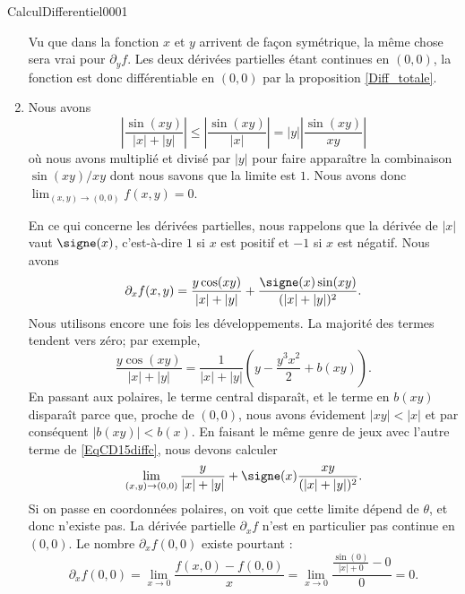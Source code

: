\begin{corrige}{CalculDifferentiel0001}
\begin{enumerate}
			Vu que dans la fonction $x$ et $y$ arrivent de façon symétrique, la même chose sera vrai pour $\partial_yf$. Les deux dérivées partielles étant continues en $(0,0)$, la fonction est donc différentiable en $(0,0)$ par la proposition \ref{Diff_totale}.


		\item
			Nous avons
			\begin{equation}
				\left| \frac{ \sin(xy) }{ | x |+| y | } \right| \leq\left| \frac{ \sin(xy) }{ | x | } \right| =| y |\left| \frac{ \sin(xy) }{ xy } \right| 
			\end{equation}
			où nous avons multiplié et divisé par $| y |$ pour faire apparaître la combinaison $\sin(xy)/xy$ dont nous savons que la limite est $1$. Nous avons donc $\lim_{(x,y)\to(0,0)}f(x,y)=0$.

			En ce qui concerne les dérivées partielles, nous rappelons que la dérivée de $| x |$ vaut $\signe(x)$, c'est-à-dire $1$ si $x$ est positif et $-1$ si $x$ est négatif. Nous avons
			\begin{equation}		\label{EqCD15diffc}
				\partial_xf(x,y)=\frac{ y\cos(xy) }{ | x |+| y | }+\frac{ \signe(x)\sin(xy) }{ (| x |+| y |)^2 }.
			\end{equation}
			Nous utilisons encore une fois les développements. La majorité des termes tendent vers zéro; par exemple,
			\begin{equation}
				\frac{ y\cos(xy) }{ | x |+| y | }=\frac{1}{ | x |+| y | }\left( y-\frac{ y^3x^2 }{2}+b(xy) \right).
			\end{equation}
			En passant aux polaires, le terme central disparaît, et le terme en $b(xy)$ disparaît parce que, proche de $(0,0)$, nous avons évidement $|xy|<|x|$ et par conséquent $| b(xy) |<b(x)$. En faisant le même genre de jeux avec l'autre terme de \eqref{EqCD15diffc}, nous devons calculer
			\begin{equation}
				\lim_{(x,y)\to(0,0)}\frac{ y }{ | x |+| y | }+\signe(x)\frac{ xy }{ (| x |+| y |)^2 }.
			\end{equation}
			Si on passe en coordonnées polaires, on voit que cette limite dépend de $\theta$, et donc n'existe pas. La dérivée partielle $\partial_xf$ n'est en particulier pas continue en $(0,0)$. Le nombre $\partial_xf(0,0)$ existe pourtant :
			\begin{equation}
				\partial_xf(0,0)=\lim_{x\to 0} \frac{ f(x,0)-f(0,0) }{ x }=\lim_{x\to 0} \frac{ \frac{ \sin(0) }{ | x |+0 }-0 }{ 0 }=0.
			\end{equation}
			


\end{enumerate}
\end{corrige}
